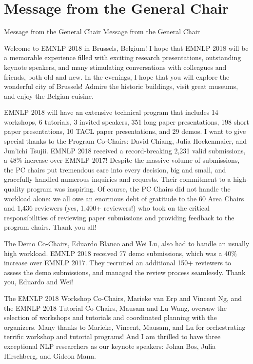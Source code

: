 \section{Message from the General Chair}\vspace{2em}
\setheaders%
    {Message from the General Chair}%
    {Message from the General Chair}
\thispagestyle{emptyheader}

\setlength{\parskip}{1ex}

Welcome to EMNLP 2018 in Brussels, Belgium! I hope that EMNLP 2018
will be a memorable experience filled with exciting research
presentations, outstanding keynote speakers, and many stimulating
conversations with colleagues and friends, both old and new. In the
evenings, I hope that you will explore the wonderful city of Brussels!
Admire the historic buildings, visit great museums, and enjoy the
Belgian cuisine.

EMNLP 2018 will have an extensive technical program that includes 14
workshops, 6 tutorials, 3 invited speakers, 351 long paper
presentations, 198 short paper presentations, 10 TACL paper
presentations, and 29 demos. I want to give special thanks to the
Program Co-Chairs: David Chiang, Julia Hockenmaier, and Jun'ichi
Tsujii. EMNLP 2018 received a record-breaking 2,231 valid submissions,
a 48\% increase over EMNLP 2017! Despite the massive volume of
submissions, the PC chairs put tremendous care into every decision, big and
small, and gracefully handled numerous inquiries and requests. Their
commitment to a high-quality program was inspiring. Of course, the PC
Chairs did not handle the workload alone: we all owe an enormous debt
of gratitude to the 60 Area Chairs and 1,436 reviewers (yes, 1,400+
reviewers!) who took on the critical responsibilities of reviewing
paper submissions and providing feedback to the program chairs. Thank
you all!

The Demo Co-Chairs, Eduardo Blanco and Wei Lu, also had to handle an
usually high workload. EMNLP 2018 received 77 demo submissions, which
was a 40\% increase over EMNLP 2017. They recruited an additional 150+
reviewers to assess the demo submissions, and managed the review
process seamlessly. Thank you, Eduardo and Wei!

The EMNLP 2018 Workshop Co-Chairs, Marieke van Erp and Vincent Ng, and
the EMNLP 2018 Tutorial Co-Chairs, Mausam and Lu Wang, oversaw the
selection of workshops and tutorials and coordinated planning with the
organizers. Many thanks to Marieke, Vincent, Mausam, and Lu for
orchestrating terrific workshop and tutorial programs!
And I am thrilled to have three exceptional NLP researchers as our
keynote speakers: Johan Bos, Julia Hirschberg, and Gideon Mann. 

